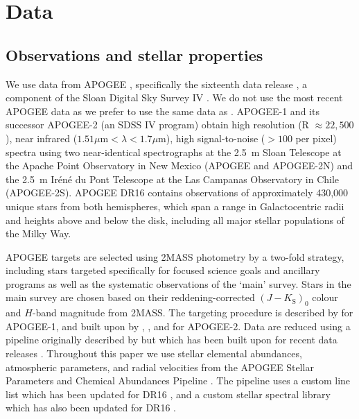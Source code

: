 \section{Data}
\label{sec:data}

\subsection{Observations and stellar properties}
\label{subsec:observations}

We use data from APOGEE \parencite{apogee}, specifically the sixteenth data release \parencite[DR16][]{sdssdr16}, a component of the Sloan Digital Sky Survey IV \parencite[SDSS][]{sdss4}. We do not use the most recent APOGEE data as we prefer to use the same data as \cite{lane22}. APOGEE-1 \parencite[an SDSS III program;][]{sdss3} and its successor APOGEE-2 (an SDSS IV program) obtain high resolution (R $\approx 22,500$), near infrared ($1.51 \mu\mathrm{m} < \lambda < 1.7 \mu\mathrm{m}$), high signal-to-noise ($> 100$ per pixel) spectra using two near-identical spectrographs \parencite{apogee_spectrographs} at the 2.5~m Sloan Telescope \parencite{gunn06} at the Apache Point Observatory in New Mexico (APOGEE and APOGEE-2N) and the 2.5~m Ir\'en\'e du Pont Telescope \parencite{bowen73a} at the Las Campanas Observatory in Chile (APOGEE-2S). APOGEE DR16 contains observations of approximately 430,000 unique stars from both hemispheres, which span a range in Galactocentric radii and heights above and below the disk, including all major stellar populations of the Milky Way.

APOGEE targets are selected using 2MASS \parencite{2mass} photometry by a two-fold strategy, including stars targeted specifically for focused science goals and ancillary programs as well as the systematic observations of the `main' survey. Stars in the main survey are chosen based on their reddening-corrected \parencite{majewski11} $(J-K_\mathrm{S})_{0}$ colour and $H$-band magnitude from 2MASS. The targeting procedure is described by \textcite{apogee_targeting} for APOGEE-1, and built upon by \textcite{apogee2_targeting}, \textcite{apogee2n_targeting}, and \textcite{apogee2s_targeting} for APOGEE-2. Data are reduced using a pipeline originally described by \textcite{apogee_pipeline} but which has been built upon for recent data releases \parencite{holtzman18,jonsson20}. Throughout this paper we use stellar elemental abundances, atmospheric parameters, and radial velocities from the APOGEE Stellar Parameters and Chemical Abundances Pipeline \parencite[ASPCAP,][]{aspcap}. The pipeline uses a custom line list \parencite{apogee_linelist} which has been updated for DR16 \parencite{apogeedr16_linelist}, and a custom stellar spectral library \parencite{apogee_speclib} which has also been updated for DR16 \parencite{jonsson20}.

